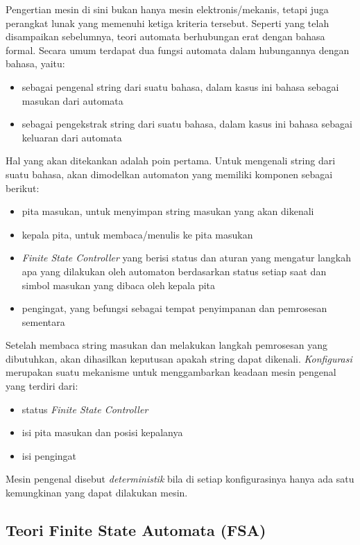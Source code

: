 Pengertian mesin di sini bukan hanya mesin elektronis/mekanis, tetapi juga perangkat lunak yang memenuhi ketiga kriteria tersebut. Seperti yang telah disampaikan sebelumnya, teori automata berhubungan erat dengan bahasa formal. Secara umum terdapat dua fungsi automata dalam hubungannya dengan bahasa, yaitu:

\begin{itemize}
	\item sebagai pengenal string dari suatu bahasa, dalam kasus ini bahasa sebagai masukan dari automata
	\item sebagai pengekstrak string dari suatu bahasa, dalam kasus ini bahasa sebagai keluaran dari automata
\end{itemize}

Hal yang akan ditekankan adalah poin pertama. Untuk mengenali string dari suatu bahasa, akan dimodelkan automaton yang memiliki komponen sebagai berikut:

\begin{itemize}
	\item pita masukan, untuk menyimpan string masukan yang akan dikenali
	\item kepala pita, untuk membaca/menulis ke pita masukan 
	\item \textit{Finite State Controller} yang berisi status dan aturan yang mengatur langkah apa yang dilakukan oleh automaton berdasarkan status setiap saat dan simbol masukan yang dibaca oleh kepala pita
	\item pengingat, yang befungsi sebagai tempat penyimpanan dan pemrosesan sementara
\end{itemize}

Setelah membaca string masukan dan melakukan langkah pemrosesan yang dibutuhkan, akan dihasilkan keputusan apakah string dapat dikenali. \textit{Konfigurasi} merupakan suatu mekanisme untuk menggambarkan keadaan mesin pengenal yang terdiri dari:

\begin{itemize}
	\item status \textit{Finite State Controller}
	\item isi pita masukan dan posisi kepalanya
	\item isi pengingat
\end{itemize}

Mesin pengenal disebut \textit{deterministik} bila di setiap konfigurasinya hanya ada satu kemungkinan yang dapat dilakukan mesin.

\subsection{Teori Finite State Automata (FSA)\cite{Frisca:2014}}

